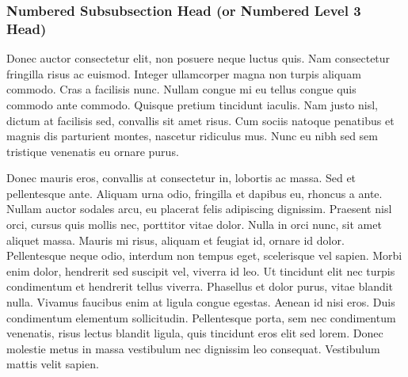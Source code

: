 \subsubsection{Numbered Subsubsection Head (or Numbered Level 3 Head)}
Donec auctor consectetur elit, non posuere neque luctus quis. Nam consectetur fringilla risus ac euismod. Integer ullamcorper magna non turpis aliquam commodo. Cras a facilisis nunc. Nullam congue mi eu tellus congue quis commodo ante commodo. Quisque pretium tincidunt iaculis. Nam justo nisl, dictum at facilisis sed, convallis sit amet risus. Cum sociis natoque penatibus et magnis dis parturient montes, nascetur ridiculus mus. Nunc eu nibh sed sem tristique venenatis eu ornare purus. 


Donec mauris eros, convallis at consectetur in, lobortis ac massa. Sed et pellentesque ante. Aliquam urna odio, fringilla et dapibus eu, rhoncus a ante. Nullam auctor sodales arcu, eu placerat felis adipiscing dignissim. Praesent nisl orci, cursus quis mollis nec, porttitor vitae dolor. Nulla in orci nunc, sit amet aliquet massa. Mauris mi risus, aliquam et feugiat id, ornare id dolor. Pellentesque neque odio, interdum non tempus eget, scelerisque vel sapien. Morbi enim dolor, hendrerit sed suscipit vel, viverra id leo. Ut tincidunt elit nec turpis condimentum et hendrerit tellus viverra. Phasellus et dolor purus, vitae blandit nulla. Vivamus faucibus enim at ligula congue egestas. Aenean id nisi eros. Duis condimentum elementum sollicitudin. Pellentesque porta, sem nec condimentum venenatis, risus lectus blandit ligula, quis tincidunt eros elit sed lorem. Donec molestie metus in massa vestibulum nec dignissim leo consequat. Vestibulum mattis velit sapien.


